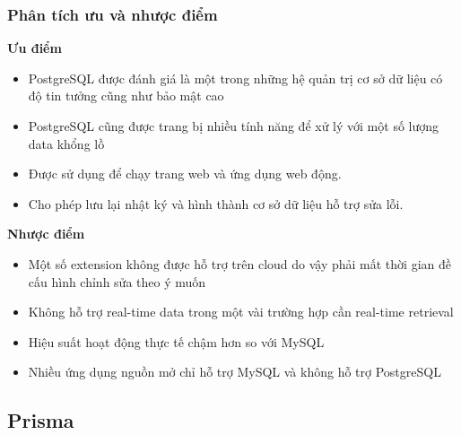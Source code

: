 \subsubsection{Phân tích ưu và nhược điểm}
\textbf{Ưu điểm}
\begin{itemize}
    \item PostgreSQL được đánh giá là một trong những hệ quản trị cơ sở dữ liệu có độ tin tưởng cũng như bảo mật cao
    \item PostgreSQL cũng được trang bị nhiều tính năng để xử lý với một số lượng data khổng lồ
    \item Được sử dụng để chạy trang web và ứng dụng web động.
    \item Cho phép lưu lại nhật ký và hình thành cơ sở dữ liệu hỗ trợ sửa lỗi.
\end{itemize}
\textbf{Nhược điểm}
\begin{itemize}
    \item Một số extension không được hỗ trợ trên cloud do vậy phải mất thời gian đề cấu hình chỉnh sửa theo ý muốn
    \item Không hỗ trợ real-time data trong một vài trường hợp cần real-time retrieval
    \item Hiệu suất hoạt động thực tế chậm hơn so với MySQL
    \item Nhiều ứng dụng nguồn mở chỉ hỗ trợ MySQL và không hỗ trợ PostgreSQL
\end{itemize} 
\subsection{Prisma}
